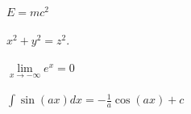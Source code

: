 \documentclass{article}
\begin{document}
$E=mc^2$
\\\\$x^2 + y^2 = z^2$.
\\\\$\mathop {\lim }\limits_{x \to  - \infty } e^x  = 0$
\\\\$\int {\sin (ax)} dx =  - \frac{1}{a}\cos (ax) + c$
\end{document}
